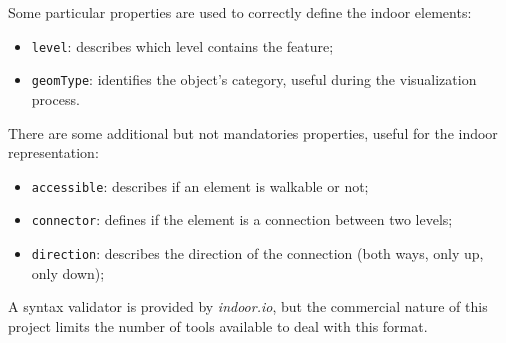 Some particular properties are used to correctly define the indoor elements:

\begin{itemize}
\itemsep1pt\parskip0pt
\item
 {\tt level}: describes which level contains the feature;
\item
 {\tt geomType}: identifies the object's
 category, useful during the visualization
 process.
\end{itemize}

There are some additional but not mandatories properties, useful for
the indoor representation:

\begin{itemize}
\itemsep1pt\parskip0pt
\item
 {\tt accessible}: describes if an element is walkable or not;
\item
 {\tt connector}: defines if the element is a connection between two
 levels;
\item
 {\tt direction}: describes the direction of the connection (both
 ways, only up, only down);
\end{itemize}

A syntax validator is provided by \emph{indoor.io}, but the commercial nature
of this project limits the number of tools available to deal with this
format.
